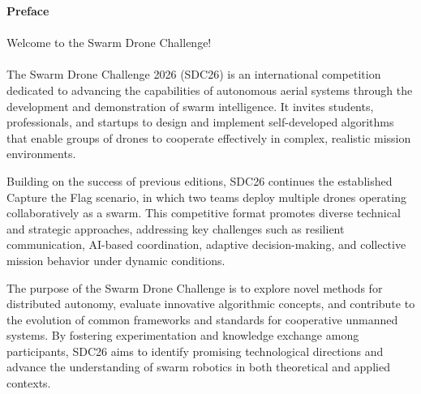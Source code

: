 
\newpage
{\bf Preface}
\\ \\ Welcome to the Swarm Drone Challenge! \\ \\
The Swarm Drone Challenge 2026 (SDC26) is an international competition dedicated to advancing the capabilities of autonomous aerial systems through the development and demonstration of swarm intelligence. It invites students, professionals, and startups to design and implement self-developed algorithms that enable groups of drones to cooperate effectively in complex, realistic mission environments.

Building on the success of previous editions, SDC26 continues the established Capture the Flag scenario, in which two teams deploy multiple drones operating collaboratively as a swarm. This competitive format promotes diverse technical and strategic approaches, addressing key challenges such as resilient communication, AI-based coordination, adaptive decision-making, and collective mission behavior under dynamic conditions.

The purpose of the Swarm Drone Challenge is to explore novel methods for distributed autonomy, evaluate innovative algorithmic concepts, and contribute to the evolution of common frameworks and standards for cooperative unmanned systems. By fostering experimentation and knowledge exchange among participants, SDC26 aims to identify promising technological directions and advance the understanding of swarm robotics in both theoretical and applied contexts.
\newpage

